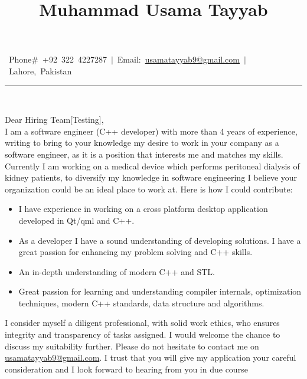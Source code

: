 \documentclass[9pt,a4paper]{article}
\title{\textbf{Muhammad Usama Tayyab}}
\date{}
\author{}
\newcommand{\MyHorizontalLine}{\noindent\rule{\textwidth}{1.5pt}\\}
\begin{document}
	\maketitle
	\vspace{-0.25in} %
	\centering\mbox{
		 Phone$\#$ +92 322 4227287
		 $\vert$ Email: \href{mailto:usamatayyab9@gmail.com} {usamatayyab9@gmail.com}
		 $\vert$
		 Lahore, Pakistan
	}
\MyHorizontalLine
\vspace{2mm}
\begin{justify}
	Dear Hiring Team[Testing],\\ \newline
	I am a software engineer (C++ developer) with more than 4 years of experience, writing to bring to your knowledge my desire to work in your company as a software engineer, as it is a position that interests me and matches my skills. Currently I am working on a medical device which performs peritoneal dialysis of kidney patients, to diversify my knowledge in software engineering I believe your organization could be an ideal place to work at. Here is how I could contribute:
	\begin{itemize}
		\item I have experience in working on a cross platform desktop application developed in Qt/qml and C++.
		\item As a developer I have a sound understanding of developing solutions. I have a great passion for enhancing my problem solving and C++ skills.
		\item An in-depth understanding of modern C++ and STL.
		\item Great passion for learning and understanding compiler internals, optimization techniques, modern C++ standards, data structure and algorithms.
	\end{itemize}
	I consider myself a diligent professional, with solid work ethics, who ensures integrity and transparency of tasks assigned. I would welcome the chance to discuss my suitability further. Please do not hesitate to contact me on \href{usamatayyab9@gmail.com}{usamatayyab9@gmail.com}. I trust that you will give my application your careful consideration and I look forward to hearing from you in due course
\end{justify}
\end{document}

